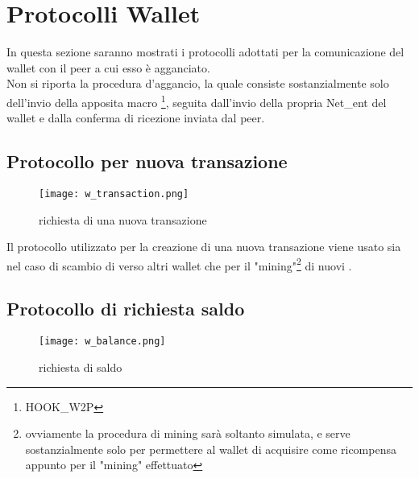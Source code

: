 \section{Protocolli Wallet}
In questa sezione saranno mostrati i protocolli adottati per la comunicazione del wallet con il peer a cui esso è agganciato.\\ Non si riporta la procedura d'aggancio, la quale consiste sostanzialmente solo dell'invio della apposita macro \footnote{HOOK\_W2P}, seguita dall'invio della propria Net\_ent del wallet e dalla conferma di ricezione inviata dal peer.

\subsection{Protocollo per nuova transazione}
\begin{figure}[H]
  \centering
  \texttt{[image: w\_transaction.png]}    
  \caption{richiesta di una nuova transazione}
  \label{fig:w_transaction}
\end{figure}

Il protocollo utilizzato per la creazione di una nuova transazione viene usato sia nel caso di scambio di \vitcoin verso altri wallet che per il "mining"\footnote{ovviamente la procedura di mining sarà soltanto simulata, e serve sostanzialmente solo per permettere al wallet di acquisire \vitcoin come ricompensa appunto per il "mining" effettuato} di nuovi \vitcoin.

\subsection{Protocollo di richiesta saldo}
\begin{figure}[H]
  \centering
  \texttt{[image: w\_balance.png]}    
  \caption{richiesta di saldo}
  \label{fig:w_balance}
\end{figure}



